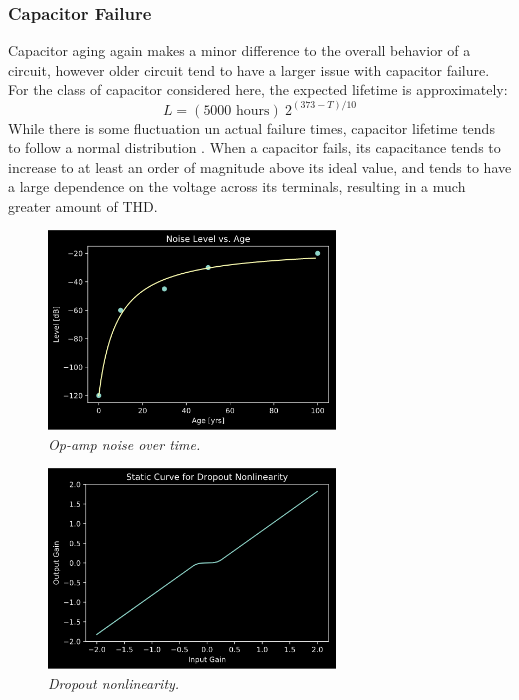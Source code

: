 \documentclass[twoside,a4paper]{article}
\begin{document}
\subsubsection{Capacitor Failure} \label{sec:cap-fail}
%
Capacitor aging again makes a minor difference to the overall behavior
of a circuit, however older circuit tend to have a larger issue with
capacitor failure. For the class of capacitor considered here, the
expected lifetime is approximately:
%
\begin{equation}
    L = (5000 \text{ hours})\ 2^{(373 - T) / 10}
    \label{eq:cap-fail}
\end{equation}
%
While there is some fluctuation un actual failure times, capacitor
lifetime tends to follow a normal distribution \cite{cap-fail}. When
a capacitor fails, its capacitance tends to increase to at least an
order of magnitude above its ideal value, and tends to have a large
dependence on the voltage across its terminals, resulting in a much
greater amount of THD.
%
\begin{figure}[h]
    \center
    \includegraphics[width=3in]{../OpAmp/Pics/age_noise.png}
    \caption{\label{opamp-age-noise}{\it Op-amp noise over time.}}
\end{figure}
%
\begin{figure}[h]
    \center
    \includegraphics[width=3in]{Pics/dropout.png}
    \caption{\label{dropout}{\it Dropout nonlinearity.}}
\end{figure}
%
\end{document}
